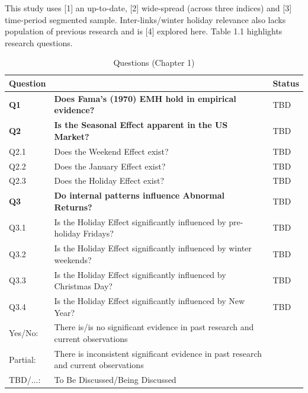 \documentclass[11pt, english]{article}
\begin{document}
	This study uses [1] an up-to-date, [2] wide-spread (across three indices) and [3] time-period segmented sample. Inter-links/winter holiday relevance also lacks population of previous research and is [4] explored here. Table 1.1 highlights research questions.

	\begin{table}[h]
		\scriptsize %
		\renewcommand{\arraystretch}{1.25}
	\begin{center}
	\begin{tabular}{lll}
		\textbf{Question} & & \textbf{Status} \\ 
		\hline
		\textbf{Q1} & \textbf{Does Fama’s (1970) EMH hold in empirical evidence?} & TBD \\
		\textbf{Q2} & \textbf{Is the Seasonal Effect apparent in the US Market?} & TBD \\
		Q2.1 & Does the Weekend Effect exist? & TBD \\
		Q2.2 & Does the January Effect exist? & TBD \\
		Q2.3 & Does the Holiday Effect exist? & TBD \\
		\textbf{Q3} & \textbf{Do internal patterns influence Abnormal Returns?} & TBD \\
		Q3.1 & Is the Holiday Effect significantly influenced by pre-holiday Fridays? & TBD \\
		Q3.2 & Is the Holiday Effect significantly influenced by winter weekends? & TBD \\
		Q3.3 & Is the Holiday Effect significantly influenced by Christmas Day? & TBD \\
		Q3.4 & Is the Holiday Effect significantly influenced by New Year? & TBD \\
		\hline
		Yes/No: & There is/is no significant evidence in past research and current observations \\
		Partial: & There is inconsistent significant evidence in past research and current observations \\
		TBD/...: & To Be Discussed/Being Discussed \\
		\hline
	\end{tabular}
		\caption{Questions (Chapter 1)}
	\end{center}
	\end{table}

	\newpage
\end{document}
